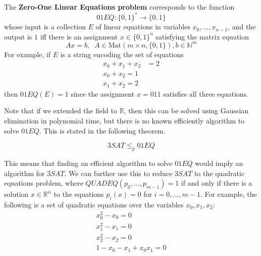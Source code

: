   \begin{definition}
    \label{def:zero-one-linear-equations-problem}
  The \textbf{Zero-One Linear Equations problem} corresponds to the function 
  \begin{equation}
    01EQ: \{0,1\}^* \to \{0,1\}
  \end{equation}
  whose input is a collection $E$ of linear equations in variables $x_0, ..., x_{n-1}$, and the output is $1$ iff there is an assignment $x \in \{0,1\}^n$ satisfying the matrix equation
  \begin{equation}
    A x = b, \;\; A \in \text{Mat}(m \times n, \{0,1\}), b \in \mathbb{N}^m
  \end{equation}
  For example, if $E$ is a string encoding the set of equations
  \begin{align*}
      x_0 + x_1 + x_2 & = 2 \\
      x_0 + x_2 = 1 \\
      x_1 + x_2 = 2
  \end{align*}
  then $01EQ(E) = 1$ since the assignment $x = 011$ satisfies all three equations.  
  \end{definition}

  Note that if we extended the field to $\mathbb{R}$, then this can be solved using Gaussian elimination in polynomial time, but there is no known efficiently algorithm to solve $01EQ$. This is stated in the following theorem. 

  \begin{theorem}
    \label{thm:hardness-of-01-linear-equations}
  \begin{equation}
    3SAT \leq_p 01EQ
  \end{equation}
  \end{theorem}

  This means that finding an efficient algorithm to solve $01EQ$ would imply an algorithm for $3SAT$. We can further use this to reduce $3SAT$ to the quadratic equations problem, where $QUADEQ(p_0, ..., p_{m-1}) = 1$ if and only if there is a solution $x \in \mathbb{R}^n$ to the equations $p_i (x) = 0$ for $i = 0, ..., m-1$. For example, the following is a set of quadratic equations over the variables $x_0, x_1, x_2$: 
  \begin{align*}
      x_0^2 - x_0 = 0 \\
      x_1^2 - x_1 = 0 \\
      x_2^2 - x_2 = 0 \\
      1 - x_0 - x_1 + x_0 x_1 = 0
  \end{align*}

